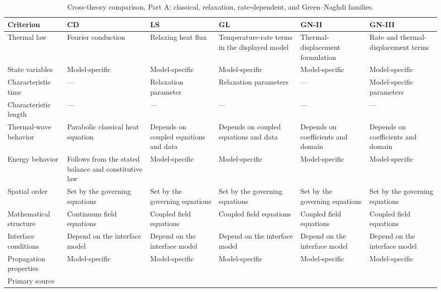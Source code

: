 \begin{table}[htbp]
\centering
\footnotesize
\caption{Cross-theory comparison, Part A: classical, relaxation, rate-dependent, and Green--Naghdi families.}
\label{tab:twelve_criteria_a}
\begin{tabularx}{\textwidth}{@{}>{\raggedright\arraybackslash}p{2.6cm}*{5}{>{\raggedright\arraybackslash}X}@{}}
\toprule
\textbf{Criterion} & \textbf{CD} & \textbf{LS} & \textbf{GL} & \textbf{GN-II} & \textbf{GN-III} \\
\midrule
Thermal law & Fourier conduction & Relaxing heat flux & Temperature-rate terms in the displayed model & Thermal-displacement formulation & Rate and thermal-displacement terms \\
State variables & Model-specific & Model-specific & Model-specific & Model-specific & Model-specific \\
Characteristic time & --- & Relaxation parameter & Relaxation parameters & --- & Model-specific parameters \\
Characteristic length & --- & --- & --- & --- & --- \\
Thermal-wave behavior & Parabolic classical heat equation & Depends on coupled equations and data & Depends on coupled equations and data & Depends on coefficients and domain & Depends on coefficients and domain \\
Energy behavior & Follows from the stated balance and constitutive law & Model-specific & Model-specific & Model-specific & Model-specific \\
Spatial order & Set by the governing equations & Set by the governing equations & Set by the governing equations & Set by the governing equations & Set by the governing equations \\
Mathematical structure & Continuum field equations & Coupled field equations & Coupled field equations & Coupled field equations & Coupled field equations \\
Interface conditions & Depend on the interface model & Depend on the interface model & Depend on the interface model & Depend on the interface model & Depend on the interface model \\
Propagation properties & Model-specific & Model-specific & Model-specific & Model-specific & Model-specific \\
Primary source & \cite{Biot1956} & \cite{Lord1967} & \cite{Green1972} & \cite{Green1993} & \cite{GreenGN1992} \\
\bottomrule
\end{tabularx}
\end{table}


